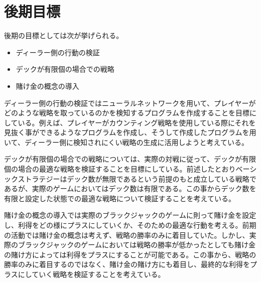 \section{後期目標}
後期の目標としては次が挙げられる。

\begin{itemize}
\item ディーラー側の行動の検証
\item デックが有限個の場合での戦略
\item 賭け金の概念の導入
\end{itemize}

ディーラー側の行動の検証ではニューラルネットワークを用いて、プレイヤーがどのような戦略を取っているのかを検知するプログラムを作成することを目標にしている。例えば、プレイヤーがカウンティング戦略を使用している際にそれを見抜く事ができるようなプログラムを作成し、そうして作成したプログラムを用いて、ディーラー側に検知されにくい戦略の生成に活用しようと考えている。

デックが有限個の場合での戦略については、実際の対戦に従って、デックが有限個の場合の最適な戦略を検証することを目標にしている。前述したとおりベーシックストラテジーはデック数が無限であるという前提のもと成立している戦略であるが、実際のゲームにおいてはデック数は有限である。この事からデック数を有限と設定した状態での最適な戦略について検証することを考えている。

賭け金の概念の導入では実際のブラックジャックのゲームに則って賭け金を設定し、利得をどの様にプラスにしていくか、そのための最適な行動を考える。前期の活動では賭け金の概念は考えず、戦略の勝率のみに着目していた。しかし、実際のブラックジャックのゲームにおいては戦略の勝率が低かったとしても賭け金の賭け方によっては利得をプラスにすることが可能である。この事から、戦略の勝率のみに着目するのではなく、賭け金の賭け方にも着目し、最終的な利得をプラスにしていく戦略を検証することを考えている。

